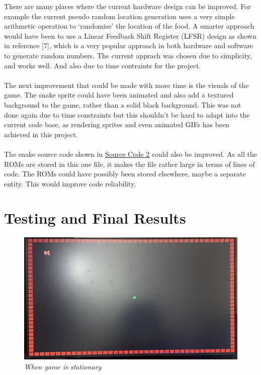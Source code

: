 \documentclass[aps, secnumarabic, balancelastpage, asmath, amssymb, nofootinbib, floatfix,]{revtex4-2}
\begin{document}
{There are many places where the current hardware design can be improved. For example the current pseudo random location generation uses a very simple arithmetic operation to `randomise' the location of the food. A smarter approach would have been to use a Linear Feedback Shift Register (LFSR) design as shown in reference [7], which is a very popular approach in both hardware and software to generate random numbers. The current apprach was chosen due to simplicity, and works well. And also due to time contraints for the project. ~\\
~\\
The next improvement that could be made with more time is the visuals of the game. The snake sprite could have been animated and also add a textured background to the game, rather than a solid black background. This was not done again due to time constraints but this shouldn't be hard to adapt into the current code base, as rendering sprites and even animated GIFs has been achieved in this project. ~\\
~\\
The snake source code shown in \hyperref[code:snake]{Source Code 2} could also be improved. As all the ROMs are stored in this one file, it makes the file rather large in terms of lines of code. The ROMs could have possibly been stored elsewhere, maybe a separate entity. This would improve code reliability.

\clearpage


\section{\fontsize{11.3pt}{12pt}\selectfont \bf Testing and Final Results}
\fontsize{11pt}{12pt}\selectfont \label{sec:3}

\begin{figure}[h]
  \centering
  \includegraphics[scale = 0.5]{stationary.jpg}
  \caption{\em When game is stationary}
  \label{fig:17}
\end{figure}

}
\end{document}
